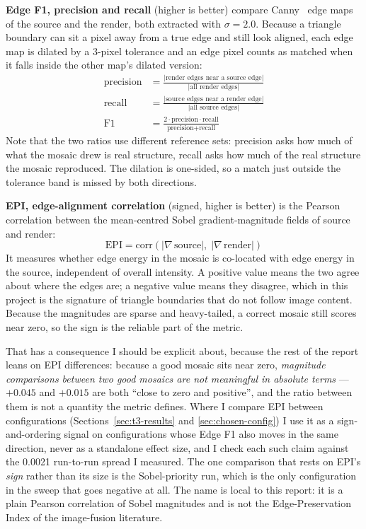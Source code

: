 \documentclass[11pt,a4paper]{article}
\begin{document}
\textbf{Edge F1, precision and recall} (higher is better) compare Canny~\cite{canny1986} edge
maps of the source and the render, both extracted with $\sigma = 2.0$. Because a
triangle boundary can sit a pixel away from a true edge and still look aligned,
each edge map is dilated by a 3-pixel tolerance and an edge pixel counts as
matched when it falls inside the other map's dilated version:
\[
\begin{aligned}
  \text{precision} &= \frac{|\text{render edges near a source edge}|}{|\text{all render edges}|} \\
  \text{recall}    &= \frac{|\text{source edges near a render edge}|}{|\text{all source edges}|} \\
  \mathrm{F1}      &= \frac{2 \cdot \text{precision} \cdot \text{recall}}{\text{precision} + \text{recall}}
\end{aligned}
\]
Note that the two ratios use different reference sets: precision asks how much of
what the mosaic drew is real structure, recall asks how much of the real
structure the mosaic reproduced. The dilation is one-sided, so a match just
outside the tolerance band is missed by both directions.

\textbf{EPI, edge-alignment correlation} (signed, higher is better) is the Pearson
correlation between the mean-centred Sobel gradient-magnitude fields of source
and render:
\[
  \mathrm{EPI} = \mathrm{corr}\!\left( |\nabla\, \text{source}|,\; |\nabla\, \text{render}| \right)
\]
It measures whether edge energy in the mosaic is co-located with edge energy in
the source, independent of overall intensity. A positive value means the two
agree about where the edges are; a negative value means they disagree, which in
this project is the signature of triangle boundaries that do not follow image
content. Because the magnitudes are sparse and heavy-tailed, a correct mosaic
still scores near zero, so the sign is the reliable part of the metric.

That has a consequence I should be explicit about, because the rest of the report
leans on EPI differences: because a good mosaic sits near zero,
\emph{magnitude comparisons between two good mosaics are not meaningful in
absolute terms} --- $+0.045$ and $+0.015$ are both ``close to zero and
positive'', and the ratio between them is not a quantity the metric defines.
Where I compare EPI between configurations (Sections~\ref{sec:t3-results} and
\ref{sec:chosen-config}) I use it as a sign-and-ordering signal on configurations
whose Edge F1 also moves in the same direction, never as a standalone effect
size, and I check each such claim against the 0.0021 run-to-run spread I
measured. The one comparison that rests on EPI's \emph{sign} rather than its size
is the Sobel-priority run, which is the only configuration in the sweep that
goes negative at all. The name is local to this report: it is a plain Pearson
correlation of Sobel magnitudes and is not the Edge-Preservation Index of the
image-fusion literature.
\end{document}
